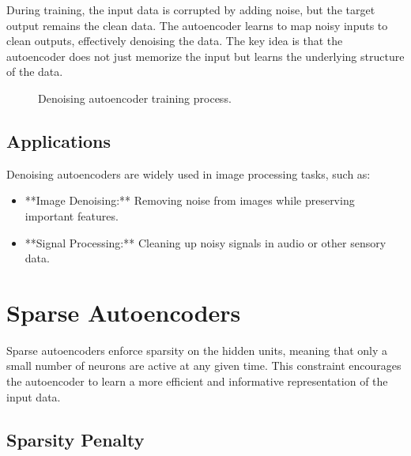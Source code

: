 \documentclass{article}
\begin{document}
During training, the input data is corrupted by adding noise, but the target output remains the clean data. The autoencoder learns to map noisy inputs to clean outputs, effectively denoising the data. The key idea is that the autoencoder does not just memorize the input but learns the underlying structure of the data.

\begin{figure}[h]
    \centering
    \caption{Denoising autoencoder training process.}
    \label{fig:denoising_ae}
\end{figure}

\subsection{Applications}

Denoising autoencoders are widely used in image processing tasks, such as:

\begin{itemize}
    \item **Image Denoising:** Removing noise from images while preserving important features.
    \item **Signal Processing:** Cleaning up noisy signals in audio or other sensory data.
\end{itemize}

\section{Sparse Autoencoders}

Sparse autoencoders enforce sparsity on the hidden units, meaning that only a small number of neurons are active at any given time. This constraint encourages the autoencoder to learn a more efficient and informative representation of the input data.

\subsection{Sparsity Penalty}
\end{document}

